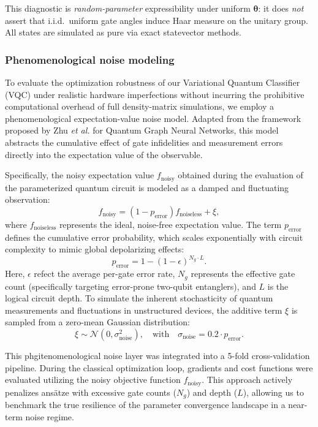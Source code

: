 \documentclass[11pt]{article}
\begin{document}
This diagnostic is \emph{random-parameter} expressibility under uniform $\boldsymbol{\theta}$: it does \emph{not} assert that i.i.d.\ uniform gate angles induce Haar measure on the unitary group. All states are simulated as pure via exact statevector methods.

\subsubsection{Phenomenological noise modeling}

To evaluate the optimization robustness of our Variational Quantum Classifier (VQC) under realistic hardware imperfections without incurring the prohibitive computational overhead of full density-matrix simulations, we employ a phenomenological expectation-value noise model. Adapted from the framework proposed by Zhu \textit{et al.} for Quantum Graph Neural Networks\cite{zhu2026}, this model abstracts the cumulative effect of gate infidelities and measurement errors directly into the expectation value of the observable.

Specifically, the noisy expectation value $f_{\text{noisy}}$ obtained during the evaluation of the parameterized quantum circuit is modeled as a damped and fluctuating observation:
\begin{equation}
    f_{\text{noisy}} = (1 - p_{\text{error}}) f_{\text{noiseless}} + \xi,
\end{equation}
where $f_{\text{noiseless}}$ represents the ideal, noise-free expectation value. The term $p_{\text{error}}$ defines the cumulative error probability, which scales exponentially with circuit complexity to mimic global depolarizing effects:
\begin{equation}
    p_{\text{error}} = 1 - (1 - \epsilon)^{N_g \cdot L}.
\end{equation}
Here, $\epsilon$ refect the average per-gate error rate, $N_g$ represents the effective gate count (specifically targeting error-prone two-qubit entanglers), and $L$ is the logical circuit depth. To simulate the inherent stochasticity of quantum measurements and fluctuations in unstructured devices, the additive term $\xi$ is sampled from a zero-mean Gaussian distribution:
\begin{equation}
    \xi \sim \mathcal{N}(0, \sigma_{\text{noise}}^2), \quad \text{with} \quad \sigma_{\text{noise}} = 0.2 \cdot p_{\text{error}}.
\end{equation}

This phgitenomenological noise layer was integrated into a 5-fold cross-validation pipeline. During the classical optimization loop, gradients and cost functions were evaluated utilizing the noisy objective function $f_{\text{noisy}}$. This approach actively penalizes ans\"atze with excessive gate counts ($N_g$) and depth ($L$), allowing us to benchmark the true resilience of the parameter convergence landscape in a near-term noise regime.
\end{document}
